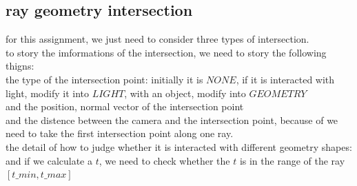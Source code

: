 \documentclass[acmtog]{acmart}
\begin{document}
\subsection{ray geometry intersection}
for this assignment, we just need to consider three types of intersection.\\
to story the imformations of the intersection, we need to story the following thigns:\\
the type of the intersection point: initially it is $NONE$, if it is interacted with light, modify it into $LIGHT$, with an object, modify into $GEOMETRY$\\
and the position, normal vector of the intersection point\\
and the distence between the camera and the intersection point, because of we need to take the first intersection point along one ray.\\
the detail of how to judge whether it is interacted with different geometry shapes:\\
and if we calculate a $t$, we need to check whether the $t$ is in the range of the ray $[t\_min,t\_max]$
\end{document}
